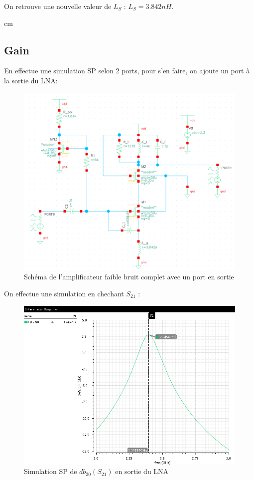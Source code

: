 \documentclass[a4paper]{article}
\begin{document}
On retrouve une nouvelle valeur de $L_S$ : $L_S = 3.842 nH$.

 cm

\subsection{Gain}
En effectue une simulation SP selon 2 ports, pour s'en faire, on ajoute un port \`a la sortie du LNA:

\begin{figure}[!htb]
\begin{center}
  \includegraphics[scale=0.30]{schematic_lna_global.png}
  \caption{Sch\'ema de l'amplificateur faible bruit complet avec un port en sortie}
  \label{schema-pol}
\end{center}
\end{figure}

\clearpage

On effectue une simulation en chechant $S_{21}$ :

\begin{figure}[!htb]
\begin{center}
  \includegraphics[scale=0.45]{Q4-S21.png}
  \caption{Simulation SP de $db_{20} (S_{21})$ en sortie du LNA}
  \label{schema-pol}
\end{center}
\end{figure}
\end{document}
